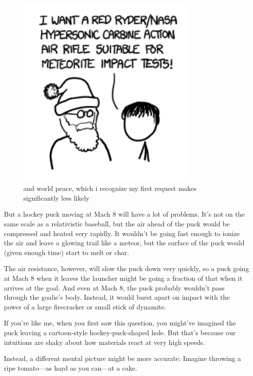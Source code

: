 \begin{figure}[!htbp]
\centering
\includegraphics[scale=0.5, max width=0.8\textwidth]{imgs/a/39/goalie_bb_gun.png}
\caption{and world peace, which i recognize my first request makes significantly less likely}
\end{figure}

{But a hockey puck moving at Mach 8 will have a lot of problems. It’s not on the same scale as a relativistic baseball, but the air ahead of the puck would be compressed and heated very rapidly. It wouldn’t be going fast enough to ionize the air and leave a glowing trail like a meteor, but the surface of the puck would (given enough time) start to melt or char.}

{The air resistance, however, will slow the puck down very quickly, so a puck going at Mach 8 when it leaves the launcher might be going a fraction of that when it arrives at the goal. And even at Mach 8, the puck probably wouldn’t pass through the goalie’s body. Instead, it would burst apart on impact with the power of a large firecracker or small stick of dynamite.}

{If you’re like me, when you first saw this question, you might’ve imagined the puck leaving a cartoon-style hockey-puck-shaped hole. But that’s because our intuitions are shaky about how materials react at very high speeds.}

{Instead, a different mental picture might be more accurate: Imagine throwing a ripe tomato—as hard as you can—at a cake.}

